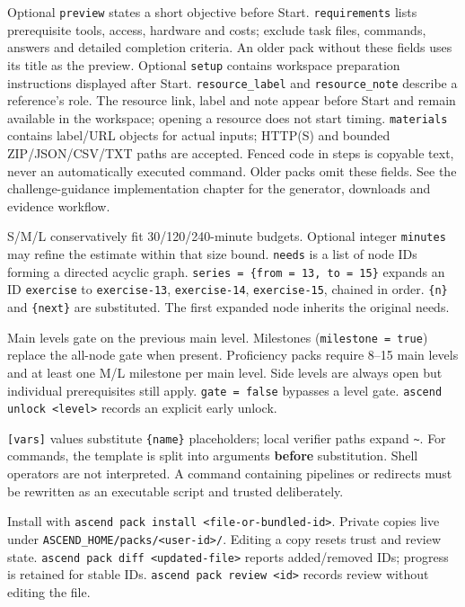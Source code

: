 Optional \texttt{preview} states a short objective before Start.
\texttt{requirements} lists prerequisite tools, access, hardware and costs;
exclude task files, commands, answers and detailed completion criteria. An older
pack without these fields uses its title as the preview. Optional \texttt{setup}
contains workspace preparation instructions displayed after Start. \texttt{resource\_label} and \texttt{resource\_note} describe a
reference's role. The resource link, label and note appear before Start and remain
available in the workspace; opening a resource does not start timing.
\texttt{materials} contains label/URL objects for actual inputs;
HTTP(S) and bounded  ZIP/JSON/CSV/TXT paths are accepted. Fenced
code in steps is copyable text, never an automatically executed command. Older
packs omit these fields. See the challenge-guidance implementation chapter for
the generator, downloads and evidence workflow.

S/M/L conservatively fit 30/120/240-minute budgets. Optional integer
\texttt{minutes} may refine the estimate within that size bound.
\texttt{needs} is a list of node IDs forming a directed acyclic graph.
\texttt{series = \{from = 13, to = 15\}} expands an ID
\texttt{exercise} to \texttt{exercise-13}, \texttt{exercise-14},
\texttt{exercise-15}, chained in order. \texttt{\{n\}} and
\texttt{\{next\}} are substituted. The first expanded node inherits the
original needs.

Main levels gate on the previous main level. Milestones
(\texttt{milestone = true}) replace the all-node gate when present.
Proficiency packs require 8--15 main levels and at least one M/L
milestone per main level. Side levels are always open but individual
prerequisites still apply. \texttt{gate = false} bypasses a level
gate. \texttt{ascend unlock \textless{}level\textgreater{}} records an
explicit early unlock.

\texttt{{[}vars{]}} values substitute \texttt{\{name\}} placeholders;
local verifier paths expand \texttt{\textasciitilde{}}. For commands,
the template is split into arguments \textbf{before} substitution. Shell
operators are not interpreted. A command containing pipelines or
redirects must be rewritten as an executable script and trusted
deliberately.

Install with
\texttt{ascend pack install \textless{}file-or-bundled-id\textgreater{}}.
Private copies live under
\texttt{ASCEND\_HOME/packs/\textless{}user-id\textgreater{}/}. Editing a
copy resets trust and review state.
\texttt{ascend pack diff \textless{}updated-file\textgreater{}}
reports added/removed IDs; progress is retained for stable IDs.
\texttt{ascend pack review \textless{}id\textgreater{}} records
review without editing the file.

